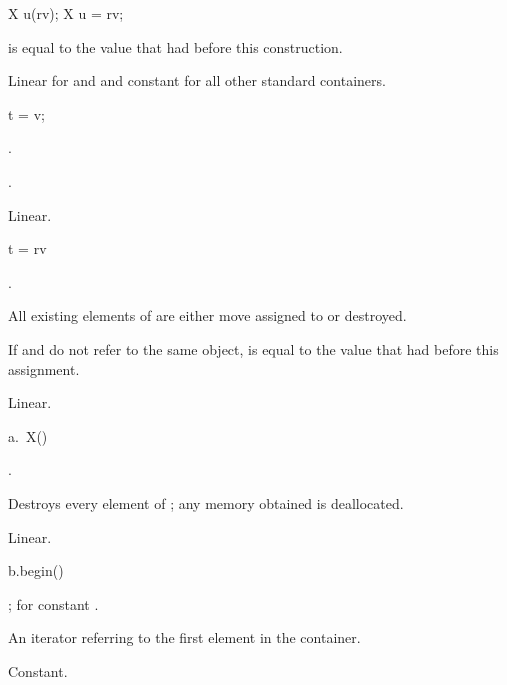 \begin{itemdecl}
X u(rv);
X u = rv;
\end{itemdecl}

\begin{itemdescr}
\pnum
\ensures
{} is equal to the value that  had before this construction.

\pnum
\complexity
Linear for  and  and constant for all other standard containers.
\end{itemdescr}

%
\begin{itemdecl}
t = v;
\end{itemdecl}

\begin{itemdescr}
\pnum
\result
{}.

\pnum
\ensures
{}.

\pnum
\complexity
Linear.
\end{itemdescr}

\begin{itemdecl}
t = rv
\end{itemdecl}

\begin{itemdescr}
\pnum
\result
{}.

\pnum
\effects
All existing elements of  are either move assigned to or destroyed.

\pnum
\ensures
If  and  do not refer to the same object,
 is equal to the value that  had before this assignment.

\pnum
\complexity
Linear.
\end{itemdescr}

\begin{itemdecl}
a.~X()
\end{itemdecl}

\begin{itemdescr}
\pnum
\result
{}.

\pnum
\effects
Destroys every element of ; any memory obtained is deallocated.

\pnum
\complexity
Linear.
\end{itemdescr}

%
\begin{itemdecl}
b.begin()
\end{itemdecl}

\begin{itemdescr}
\pnum
\result
{};
 for constant .

\pnum
\returns
An iterator referring to the first element in the container.

\pnum
\complexity
Constant.
\end{itemdescr}

